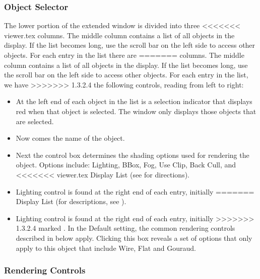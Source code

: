 \subsubsection{Object Selector}

The lower portion of the extended \viewer{} window is divided into three
<<<<<<< viewer.tex
columns. The middle column contains a list of all objects in the
display.  If the list becomes long, use the scroll bar on the left
side to access other objects.  For each entry in the list there are
=======
columns. The middle column contains a list of all objects in the
display.  If the list becomes long, use the scroll bar on the left
side to access other objects.  For each entry in the list, we have
>>>>>>> 1.3.2.4
the following controls, reading from left to right:

\begin{itemize}
  \item At the left end of each object
        in the list is a selection indicator that displays red
        when that object is 
        selected.  The \viewer{} window only displays those objects that
        are selected.
  \item Now comes the name of the object.
  \item Next the  control box determines the
        shading options used for rendering the object.
        Options include: Lighting, BBox, Fog, Use Clip, Back Cull, and
<<<<<<< viewer.tex
        Display List  (see
         for directions).
  \item Lighting control is found at the right end of each entry, initially
=======
        Display List (for descriptions, see
        ).
  \item Lighting control is found at the right end of each entry, initially
>>>>>>> 1.3.2.4
        marked .  In the Default setting, the common
        rendering controls described in  below apply.  Clicking this box
        reveals a set of options that only apply to this object that
        include Wire, Flat and Gouraud.
\end{itemize}


\subsubsection{Rendering Controls}
\label{sec:view-rendering} 

